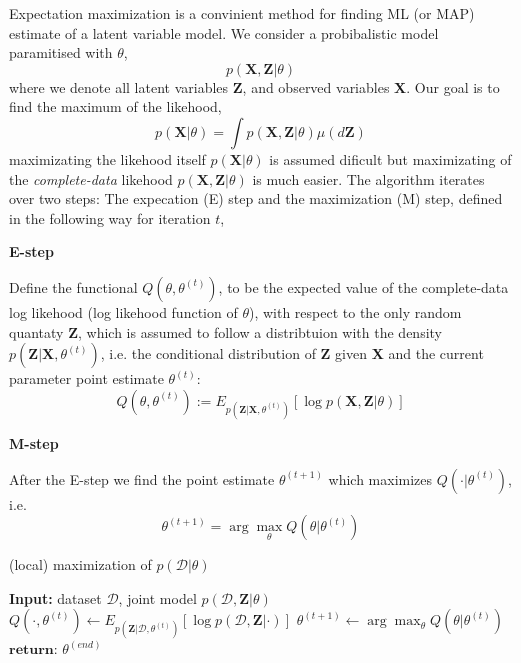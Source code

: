 \begin{testexample2}
    Expectation maximization is a convinient method for finding ML (or MAP) estimate of a 
    latent variable model. We consider a probibalistic model paramitised with $\theta$, 
    $$p(\textbf{X}, \textbf{Z}|\theta)$$ where we denote all latent variables \textbf{Z}, and
    observed variables \textbf{X}. Our goal is to find the maximum of the likehood, 
    $$p(\textbf{X}|\theta) = \int p(\textbf{X}, \textbf{Z}| \theta) \mu(d\textbf{Z})$$
    maximizating the likehood itself $p(\textbf{X}|\theta)$ is assumed dificult 
    but maximizating of the \textit{complete-data} likehood $p(\textbf{X}, \textbf{Z}|\theta)$
    is much easier. The algorithm iterates over two steps: The expecation (E) step and the maximization (M) step, 
    defined in the following way for iteration $t$, 
    
    \textbf{E-step}

    Define the functional $Q(\theta,\theta^{(t)})$, to be the expected value of the complete-data 
    log likehood (log likehood function of $\theta$), with respect to the only random quantaty $\textbf{Z}$,
    which is assumed to follow a distribtuion with the density $p(\textbf{Z}|\textbf{X}, \theta^{(t)})$,
    i.e. the conditional distribution of \textbf{Z} given \textbf{X} and the current parameter point estimate
    $\theta^{(t)}$: 
    $$Q(\theta,\theta^{(t)}) := E_{p(\textbf{Z}|\textbf{X}, \theta^{(t)})}[\log p(\textbf{X}, \textbf{Z}|\theta)]$$

    \textbf{M-step}

    After the E-step we find the point estimate $\theta^{(t+1)}$ which maximizes $Q(\cdot|\theta^{(t)})$, i.e.
    $$\theta^{(t+1)} = \arg\max_{\theta} Q(\theta|\theta^{(t)})$$

    \begin{algorithm}[H]
        \caption*{(local) maximization of $p(\mathcal{D}|\theta)$}\label{EM}
        \begin{algorithmic}
        \State \textbf{Input:} dataset $\mathcal{D}$, joint model $p(\mathcal{D}, \textbf{Z}|\theta)$
            \State $Q(\cdot, \theta^{(t)}) \gets E_{p(\textbf{Z}|\mathcal{D}, \theta^{(t)})}[\log p(\mathcal{D}, \textbf{Z}|\cdot)]$ 
            \State $\theta^{(t+1)} \gets \arg\max_{\theta} Q(\theta|\theta^{(t)})$ 
        \EndWhile
        \State $\textbf{return: } \theta^{(end)}$
    \end{algorithmic}
    \end{algorithm}


\end{testexample2}
